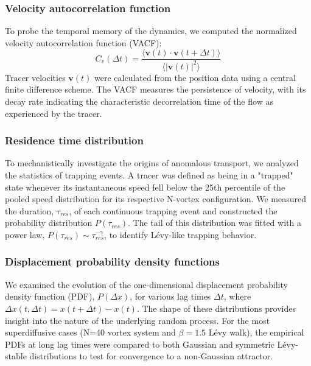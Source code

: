 \documentclass[]{article}
\begin{document}
\subsubsection{Velocity autocorrelation function}
To probe the temporal memory of the dynamics, we computed the normalized velocity autocorrelation function (VACF):
\begin{equation}
C_v(\Delta t) = \frac{\langle \mathbf{v}(t) \cdot \mathbf{v}(t+\Delta t) \rangle}{\langle |\mathbf{v}(t)|^2 \rangle}
\end{equation}
Tracer velocities $\mathbf{v}(t)$ were calculated from the position data using a central finite difference scheme. The VACF measures the persistence of velocity, with its decay rate indicating the characteristic decorrelation time of the flow as experienced by the tracer.

\subsubsection{Residence time distribution}
To mechanistically investigate the origins of anomalous transport, we analyzed the statistics of trapping events. A tracer was defined as being in a "trapped" state whenever its instantaneous speed fell below the 25th percentile of the pooled speed distribution for its respective N-vortex configuration. We measured the duration, $\tau_{res}$, of each continuous trapping event and constructed the probability distribution $P(\tau_{res})$. The tail of this distribution was fitted with a power law, $P(\tau_{res}) \sim \tau_{res}^{-\gamma}$, to identify Lévy-like trapping behavior.

\subsubsection{Displacement probability density functions}
We examined the evolution of the one-dimensional displacement probability density function (PDF), $P(\Delta x)$, for various lag times $\Delta t$, where $\Delta x(t, \Delta t) = x(t+\Delta t) - x(t)$. The shape of these distributions provides insight into the nature of the underlying random process. For the most superdiffusive cases (N=40 vortex system and $\beta=1.5$ Lévy walk), the empirical PDFs at long lag times were compared to both Gaussian and symmetric Lévy-stable distributions to test for convergence to a non-Gaussian attractor.
\end{document}
